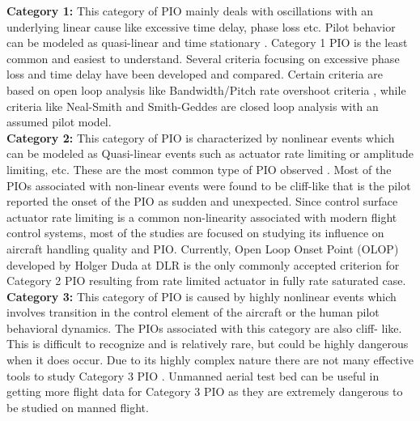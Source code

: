 \textbf{Category 1:} This category of PIO mainly deals with oscillations with an underlying linear cause like excessive
time delay, phase loss etc. Pilot behavior can be modeled as quasi-linear and time stationary\cite{mcruer1997aviation} . Category 1 PIO is the least common and easiest to understand. Several criteria focusing on excessive phase loss and time delay have been developed and compared\cite{moorhouse2000flight}\cite{liu2010prediction}\cite{garteur1999evaluation}. Certain criteria are based on open loop analysis like Bandwidth/Pitch rate overshoot criteria\cite{mitchell2004recommended} , while criteria like Neal-Smith\cite{neal1970flight} and Smith-Geddes\cite{smith1978effects}\cite{smith1995observations}\cite{mitchell1998critical}\cite{smith1979handling} are closed loop analysis with an assumed pilot model.\\
\textbf{Category 2:} This category of PIO is characterized by nonlinear events which can be modeled as Quasi-linear
events such as actuator rate limiting or amplitude limiting, etc. These are the most common type of PIO observed\cite{mcruer1997aviation} .
Most of the PIOs associated with non-linear events were found to be cliff-like that is the pilot reported the onset of
the PIO as sudden and unexpected. Since control surface actuator rate limiting is a common non-linearity associated
with modern flight control systems\cite{klyde2004investigating}\cite{duda1997prediction}\cite{amato2000analysis}\cite{hanke1995handling}, most of the studies are focused on studying its influence on aircraft handling quality and PIO. Currently, Open Loop Onset Point\cite{duda1997prediction} (OLOP) developed by Holger Duda at DLR is the only commonly accepted criterion\cite{moorhouse2000flight}\cite{garteur1999evaluation} for Category 2 PIO resulting from rate limited actuator in fully rate saturated case.\\
\textbf{Category 3:} This category of PIO is caused by highly nonlinear events which involves transition in the control
element of the aircraft or the human pilot behavioral dynamics. The PIOs associated with this category are also cliff-
like. This is difficult to recognize and is relatively rare, but could be highly dangerous when it does occur\cite{mcruer1997aviation}. Due to its highly complex nature there are not many effective tools to study Category 3 PIO . Unmanned aerial test bed can be useful in getting more flight data for Category 3 PIO as they are extremely dangerous to be studied on manned flight.
